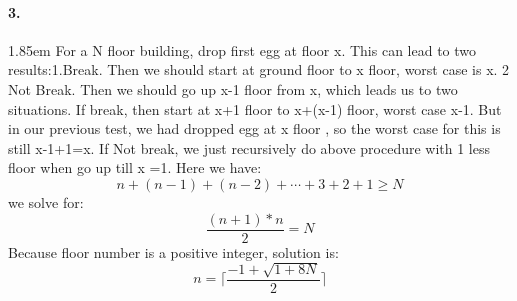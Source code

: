 \documentclass[12pt]{article}
\begin{document}
\paragraph{3.}
\hangindent 1.85em
\noindent
For a N floor building, drop first egg at floor x. This can lead to two results:1.Break. Then we should start at ground floor to x floor, worst case is x. 2 Not Break. Then we should go up x-1 floor from x, which leads us to two situations. If break, then start at x+1 floor to x+(x-1) floor, worst case x-1. But in our previous test, we had dropped egg at x floor , so the worst case for this is still x-1+1=x. If Not break, we just recursively do above procedure with 1 less floor when go up till x =1.  Here we have:
\[
n+(n-1)+(n-2)+ \cdots +3+2+1\geq N
\]
we solve for:
\[
\frac{(n+1)*n}{2}= N
\]
Because floor number is a positive integer, solution is:
\[
n=\lceil\frac{-1+\sqrt{1+8N}}{2}\rceil 
\]
\end{document}
